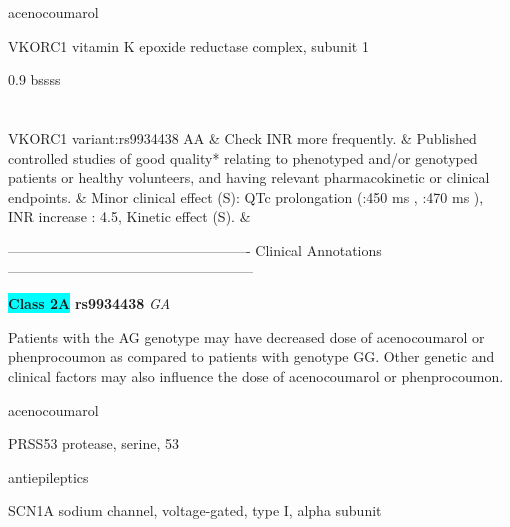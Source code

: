 \documentclass{resume} %
\begin{document}
\begin{rSection}{ acenocoumarol }
\begin{rSubsection}{ VKORC1 }{ vitamin K epoxide reductase complex, subunit 1 }{}{}
\begin{center}
\begin{tabularx}{0.9\textwidth}{ bssss }
		\vspace{1pt}\\
		\hline \\
		\vspace{1pt}\\
		         VKORC1 variant:rs9934438 AA & Check INR more frequently. & Published controlled studies of good quality* relating to phenotyped and/or genotyped patients or healthy volunteers, and having relevant pharmacokinetic or clinical endpoints. & Minor clinical effect (S): QTc prolongation (:450 ms , :470 ms ),  INR increase : 4.5,  Kinetic effect (S). &
\\
		\end{tabularx}
		\end{center}
		\normalsize
		\vspace{10pt}
		        
\item[] ---------------------------------------------------- Clinical Annotations -----------------------------------------------------\newline
\item \textbf{\colorbox{cyan} {Class 2A}} \textbf{ rs9934438 } \textit{ GA }
\item[] Patients with the AG genotype may have decreased dose of acenocoumarol or phenprocoumon as compared to patients with genotype GG. Other genetic and clinical factors may also influence the dose of acenocoumarol or phenprocoumon.

\end{rSubsection}

\end{rSection}\begin{rSection}{ acenocoumarol }
\item[]
\begin{rSubsection}{ PRSS53 }{ protease, serine, 53 }{}{}
\item[]


\end{rSubsection}

\end{rSection}\begin{rSection}{ antiepileptics }
\item[]
\begin{rSubsection}{ SCN1A }{ sodium channel, voltage-gated, type I, alpha subunit }{}{}
\item[]


\end{rSubsection}


\end{rSection}
\end{document}
